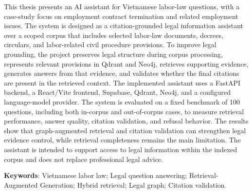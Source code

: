\documentclass[11pt]{extarticle}
\begin{document}
\clearpage
\renewcommand{\listtablename}{LIST OF TABLES}
{}
\listoftables

\clearpage
\renewcommand{\listfigurename}{LIST OF FIGURES}
{}
\listoffigures

This thesis presents an AI assistant for Vietnamese labor-law questions, with a case-study focus on employment contract termination and related employment issues. The system is designed as a citation-grounded legal information assistant over a scoped corpus that includes selected labor-law documents, decrees, circulars, and labor-related civil procedure provisions. To improve legal grounding, the project preserves legal structure during corpus processing, represents relevant provisions in Qdrant and Neo4j, retrieves supporting evidence, generates answers from that evidence, and validates whether the final citations are present in the retrieved context. The implemented assistant uses a FastAPI backend, a React/Vite frontend, Supabase, Qdrant, Neo4j, and a configured language-model provider. The system is evaluated on a fixed benchmark of 100 questions, including both in-corpus and out-of-corpus cases, to measure retrieval performance, answer quality, citation validation, and refusal behavior. The results show that graph-augmented retrieval and citation validation can strengthen legal evidence control, while retrieval completeness remains the main limitation. The assistant is intended to support access to legal information within the indexed corpus and does not replace professional legal advice.

\textbf{Keywords}: Vietnamese labor law; Legal question answering; Retrieval-Augmented Generation; Hybrid retrieval; Legal graph; Citation validation.

\clearpage
{}








\clearpage
\printbibliography[heading=bibintoc,title={References}]

\clearpage
\appendix




\end{document}
